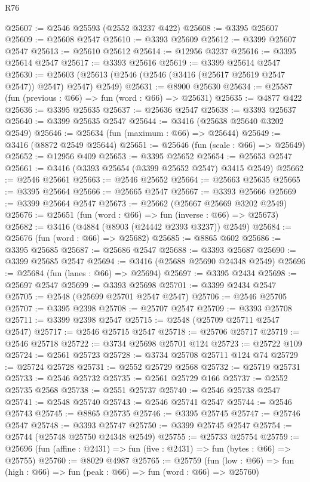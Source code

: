 \begin{lexlean}{R76}
\begin{coremodule}
@25607 := @2546 @25593 (@2552 @3237 @422)
@25608 := @3395 @25607
@25609 := @25608 @2547
@25610 := @3393 @25609
@25612 := @3399 @25607 @2547
@25613 := @25610 @25612
@25614 := @12956 @3237
@25616 := @3395 @25614 @2547
@25617 := @3393 @25616
@25619 := @3399 @25614 @2547
@25630 := @25603 (@25613 (@2546 (@2546 (@3416 (@25617 @25619 @2547 @2547)) @2547) @2547) @2549)
@25631 := @8900 @25630
@25634 := @25587 (fun (previous : @66) => fun (word : @66) => @25631)
@25635 := @4877 @422
@25636 := @3395 @25635
@25637 := @25636 @2547
@25638 := @3393 @25637
@25640 := @3399 @25635 @2547
@25644 := @3416 (@25638 @25640 @3202 @2549)
@25646 := @25634 (fun (maximum : @66) => @25644)
@25649 := @3416 (@8872 @2549 @25644)
@25651 := @25646 (fun (scale : @66) => @25649)
@25652 := @12956 @409
@25653 := @3395 @25652
@25654 := @25653 @2547
@25661 := @3416 (@3393 @25654 (@3399 @25652 @2547) @3415 @2549)
@25662 := @2546 @25661
@25663 := @2546 @25652
@25664 := @25663 @25635
@25665 := @3395 @25664
@25666 := @25665 @2547
@25667 := @3393 @25666
@25669 := @3399 @25664 @2547
@25673 := @25662 (@25667 @25669 @3202 @2549)
@25676 := @25651 (fun (word : @66) => fun (inverse : @66) => @25673)
@25682 := @3416 (@4884 (@8903 (@24442 @2393 @3237)) @2549)
@25684 := @25676 (fun (word : @66) => @25682)
@25685 := @8865 @602
@25686 := @3395 @25685
@25687 := @25686 @2547
@25688 := @3393 @25687
@25690 := @3399 @25685 @2547
@25694 := @3416 (@25688 @25690 @24348 @2549)
@25696 := @25684 (fun (lanes : @66) => @25694)
@25697 := @3395 @2434
@25698 := @25697 @2547
@25699 := @3393 @25698
@25701 := @3399 @2434 @2547
@25705 := @2548 (@25699 @25701 @2547 @2547)
@25706 := @2546 @25705
@25707 := @3395 @2398
@25708 := @25707 @2547
@25709 := @3393 @25708
@25711 := @3399 @2398 @2547
@25715 := @2548 (@25709 @25711 @2547 @2547)
@25717 := @2546 @25715 @2547
@25718 := @25706 @25717
@25719 := @2546 @25718
@25722 := @3734 @25698 @25701 @124
@25723 := @25722 @109
@25724 := @2561 @25723
@25728 := @3734 @25708 @25711 @124 @74
@25729 := @25724 @25728
@25731 := @2552 @25729 @2568
@25732 := @25719 @25731
@25733 := @2546 @25732
@25735 := @2561 @25729 @166
@25737 := @2552 @25735 @2568
@25738 := @2551 @25737
@25740 := @2546 @25738 @2547
@25741 := @2548 @25740
@25743 := @2546 @25741 @2547
@25744 := @2546 @25743
@25745 := @8865 @25735
@25746 := @3395 @25745
@25747 := @25746 @2547
@25748 := @3393 @25747
@25750 := @3399 @25745 @2547
@25754 := @25744 (@25748 @25750 @24348 @2549)
@25755 := @25733 @25754
@25759 := @25696 (fun (affine : @2431) => fun (five : @2431) => fun (bytes : @66) => @25755)
@25760 := @8029 @4987
@25765 := @25759
    (fun (low : @66) => fun (high : @66) => fun (peak : @66) => fun (word : @66) => @25760)

\end{coremodule}
\end{lexlean}
